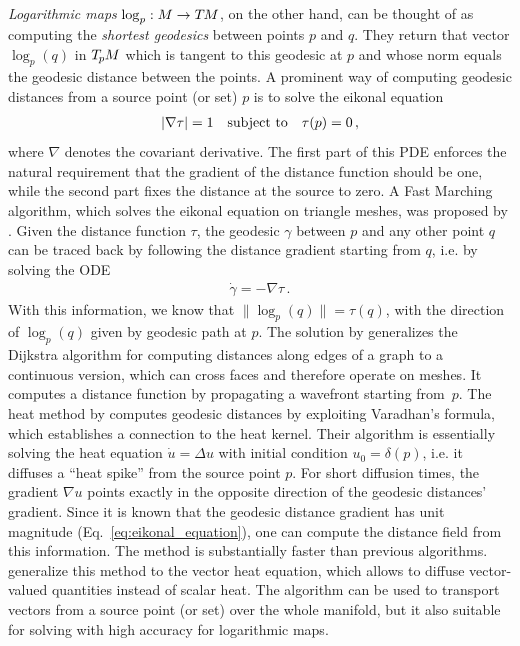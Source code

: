 \emph{Logarithmic maps} $\log_p: M \to T\mkern-1.5muM$, on the other hand, can be thought of as computing the \emph{shortest geodesics} between points $p$ and $q$.
They return that vector $\log_p(q)$ in $T_{\mkern-1.5mu p}\mkern-.5muM$ which is tangent to this geodesic at $p$ and whose norm equals the geodesic distance between the points.
A prominent way of computing geodesic distances from a source point (or set) $p$ is to solve the eikonal equation
\begin{align}\label{eq:eikonal_equation}
    |\nabla \tau| = 1
    \quad\textup{subject to}\quad
    \tau(p) = 0 \,,
\end{align}
where $\nabla$ denotes the covariant derivative.
The first part of this PDE enforces the natural requirement that the gradient of the distance function should be one, while the second part fixes the distance at the source to zero.
A Fast Marching algorithm, which solves the eikonal equation on triangle meshes, was proposed by \citet{kimmel1998computingGeodesics}.
Given the distance function $\tau$, the geodesic $\gamma$ between $p$ and any other point $q$ can be traced back by following the distance gradient starting from $q$, i.e. by solving the ODE
\begin{align}
    \dot{\gamma} = -\nabla \tau \,.
\end{align}
With this information, we know that $\lVert\log_p(q)\rVert = \tau(q)$, with the direction of $\log_p(q)$ given by geodesic path at $p$.
The solution by \citet{mitchell1987discrete} generalizes the Dijkstra algorithm for computing distances along edges of a graph to a continuous version, which can cross faces and therefore operate on meshes.
It computes a distance function by propagating a wavefront starting from~$p$.
The heat method by \citet{Crane2017HeatMethodDistance} computes geodesic distances by exploiting Varadhan’s formula, which establishes a connection to the heat kernel.
Their algorithm is essentially solving the heat equation $\dot{u} = \Delta u$ with initial condition $u_0 = \delta(p)$, i.e. it diffuses a ``heat spike'' from the source point $p$.
For short diffusion times, the gradient $\nabla u$ points exactly in the opposite direction of the geodesic distances' gradient.
Since it is known that the geodesic distance gradient has unit magnitude (Eq.~\eqref{eq:eikonal_equation}), one can compute the distance field from this information.
The method is substantially faster than previous algorithms.
\citet{Sharp2019VectorHeatMethod} generalize this method to the vector heat equation, which allows to diffuse vector-valued quantities instead of scalar heat.
The algorithm can be used to transport vectors from a source point (or set) over the whole manifold, but it also suitable for solving with high accuracy for logarithmic maps.

